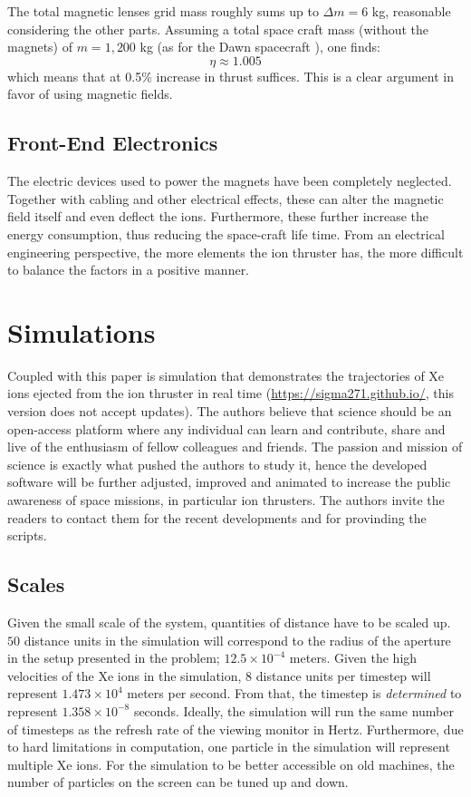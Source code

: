 \documentclass[twocolumn,12pt]{article}
\numberwithin{equation}{section} %
\numberwithin{equation}{section}
\begin{document}
The total magnetic lenses grid mass roughly sums up to $\Delta m = 6$ kg, reasonable considering the other parts. \cite{dawnmass} Assuming a total space craft mass (without the magnets) of $m = 1,200$ kg (as for the Dawn spacecraft \cite{dawnmass}), one finds:
\begin{equation}
    \eta \approx 1.005
    \label{minimalmassimprovement}
\end{equation}
which means that at 0.5\% increase in thrust suffices. This is a clear argument in favor of using magnetic fields.

\subsection{Front-End Electronics}
The electric devices used to power the magnets have been completely neglected. Together with cabling and other electrical effects, these can alter the magnetic field itself and even deflect the ions. Furthermore, these further increase the energy consumption, thus reducing the space-craft life time. From an electrical engineering perspective, the more elements the ion thruster has, the more difficult to balance the factors in a positive manner.


\section{Simulations}
\label{sectionsimulation}
Coupled with this paper is simulation that demonstrates the trajectories of Xe ions ejected from the ion thruster in real time (\href{https://sigma271.github.io/}{https://sigma271.github.io/}, this version does not accept updates). The authors believe that science should be an open-access platform where any individual can learn and contribute, share and live of the enthusiasm of fellow colleagues and friends. The passion and mission of science is exactly what pushed the authors to study it, hence the developed software will be further adjusted, improved and animated to increase the public awareness of space missions, in particular ion thrusters. The authors invite the readers to contact them for the recent developments and for provinding the scripts.


\subsection{Scales}
Given the small scale of the system, quantities of distance have to be scaled up. $50$ distance units in the simulation will correspond to the radius of the aperture in the setup presented in the problem; $12.5\times 10^{-4}$ meters. Given the high velocities of the Xe ions in the simulation, $8$ distance units per timestep will represent $1.473 \times 10^4$ meters per second. From that, the timestep is \emph{determined} to represent $1.358\times10^{-8}$ seconds. Ideally, the simulation will run the same number of timesteps as the refresh rate of the viewing monitor in Hertz. Furthermore, due to hard limitations in computation, one particle in the simulation will represent multiple Xe ions. For the simulation to be better accessible on old machines, the number of particles on the screen can be tuned up and down.
\end{document}
